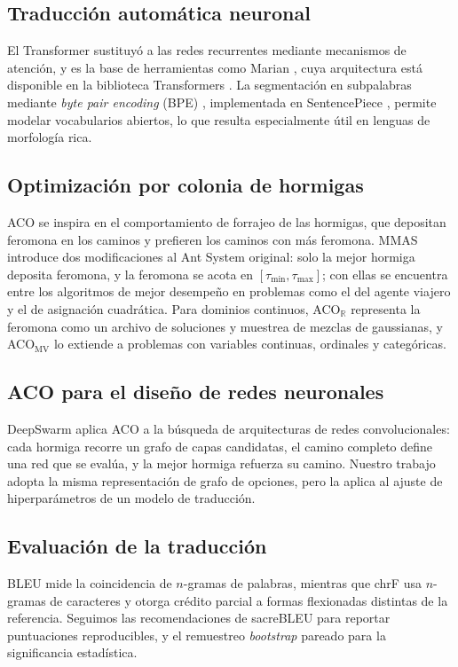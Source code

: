 \documentclass[conference]{IEEEtran}
\newcommand{\chrf}{chrF}
\begin{document}
\subsection{Traducción automática neuronal}
El Transformer \cite{vaswani2017attention} sustituyó a las redes
recurrentes mediante mecanismos de atención, y es la base de herramientas
como Marian \cite{junczys2018marian}, cuya arquitectura está disponible en
la biblioteca Transformers \cite{wolf2020transformers}. La segmentación en
subpalabras mediante \emph{byte pair encoding} (BPE)
\cite{sennrich2016bpe}, implementada en SentencePiece
\cite{kudo2018sentencepiece}, permite modelar vocabularios abiertos, lo
que resulta especialmente útil en lenguas de morfología rica.

\subsection{Optimización por colonia de hormigas}
ACO \cite{dorigo2004aco} se inspira en el comportamiento de forrajeo de
las hormigas, que depositan feromona en los caminos y prefieren los
caminos con más feromona. MMAS \cite{stutzle2000mmas} introduce dos
modificaciones al Ant System original: solo la mejor hormiga deposita
feromona, y la feromona se acota en $[\tau_{\min}, \tau_{\max}]$; con
ellas se encuentra entre los algoritmos de mejor desempeño en problemas
como el del agente viajero y el de asignación cuadrática. Para dominios
continuos, ACO$_\mathbb{R}$ \cite{socha2008acor} representa la feromona
como un archivo de soluciones y muestrea de mezclas de gaussianas, y
ACO$_\text{MV}$ \cite{liao2014acomv} lo extiende a problemas con
variables continuas, ordinales y categóricas.

\subsection{ACO para el diseño de redes neuronales}
DeepSwarm \cite{byla2019deepswarm} aplica ACO a la búsqueda de
arquitecturas de redes convolucionales: cada hormiga recorre un grafo de
capas candidatas, el camino completo define una red que se evalúa, y la
mejor hormiga refuerza su camino. Nuestro trabajo adopta la misma
representación de grafo de opciones, pero la aplica al ajuste de
hiperparámetros de un modelo de traducción.

\subsection{Evaluación de la traducción}
BLEU \cite{papineni2002bleu} mide la coincidencia de $n$-gramas de
palabras, mientras que \chrf{} \cite{popovic2015chrf} usa $n$-gramas de
caracteres y otorga crédito parcial a formas flexionadas distintas de la
referencia. Seguimos las recomendaciones de sacreBLEU
\cite{post2018sacrebleu} para reportar puntuaciones reproducibles, y el
remuestreo \emph{bootstrap} pareado \cite{koehn2004bootstrap} para la
significancia estadística.
\end{document}
